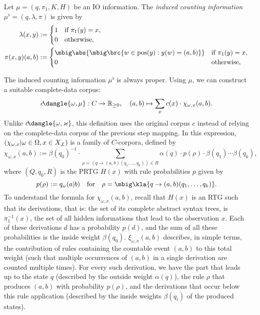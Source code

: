 \begin{definition}
 Let $\mu=(q,\pi_1,K,H)$ be an IO information. The \emph{induced counting
 information} $\mu^\flat = (q,\lambda,\pi)$ is given by
 \begin{align*}
  \lambda(x,y) &:= \begin{cases}
   1 & \text{if } \pi_1(y) = x, \\
   0 & \text{otherwise},
  \end{cases} \\
  \pi(x,y)(a,b) &:= \begin{cases}
   \mbig\abs{\mbig\brc{w\in\pos(y): y(w)=(a,b)}} & \text{if } \pi_1(y) = x, \\
   0 & \text{otherwise},
  \end{cases}
 \end{align*}
\end{definition}
The induced counting information $\mu^\flat$ is always proper.
\cite[p.~15]{bucstuvog15} Using $\mu$, we can construct a suitable complete-data corpus:
\[
 c\!\dangle{\omega,\mu}: C\to\zr_{\geq0}, \quad
 (a,b) \mapsto \sum_x c(x) \cdot \chi_{\omega,x}(a,b).
\]
Unlike $c\!\dangle{\omega,\varkappa}$, this definition uses the original corpus
$c$ instead of relying on the complete-data corpus of the previous step
mapping. In this expression, $(\chi_{\omega,x}|\omega\in\Omega,x\in
X_{\not\bot})$ is a family of $C$-corpora, defined by
\[
 \chi_{\omega,x}(a,b) := \beta(q_0)^{-1} \cdot \sum_{\rho = (q\to(a,b)(q_1,\ldots,q_k))\in R} \alpha(q) \cdot p(\rho) \cdot \beta(q_1) \cdots \beta(q_k),
\]
where $(Q,q_0,R)$ is the PRTG $H(x)$ with rule probabilities $p$ given by
\[
 p(\rho) := q_\omega(a|b) \quad\text{for}\quad \rho = \mbig\kla{q\to(a,b)(q_1,\ldots,q_k)}.
\]
To understand the formula for $\chi_{\omega,x}(a,b)$, recall that $H(x)$ is an
RTG such that its derivations, that is: the set of its complete abstract syntax
trees, is $\pi_1^{-1}(x)$, the set of all hidden informations that lead to the
observation $x$. Each of these derivations $d$ has a probability $p(d)$, and
the sum of all these probabilities is the inside weight $\beta(q_0)$.
$\xi_{\omega,x}(a,b)$ describes, in simple terms, the contribution of rules
containing the countable event $(a,b)$ to this total weight (such that
multiple occurrences of $(a,b)$ in a single derivation are counted multiple
times). For every such derivation, we have the part that leads up to the state
$q$ (described by the outside weight $\alpha(q)$), the rule $\rho$ that
produces $(a,b)$ with probability $p(\rho)$, and the derivations that occur
below this rule application (described by the inside weights $\beta(q_i)$ of
the produced states).

